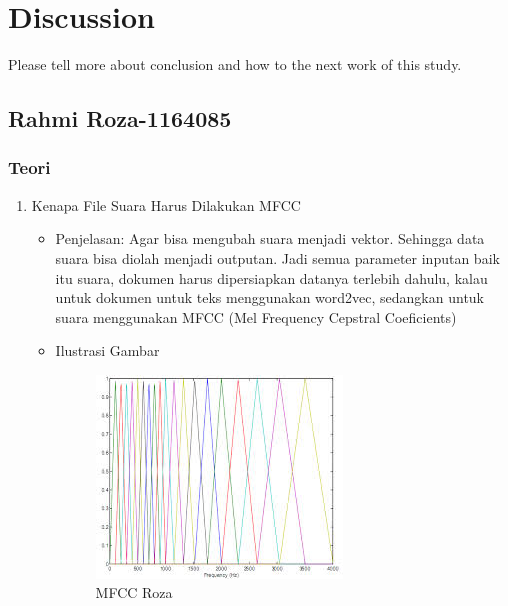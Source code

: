 \chapter{Discussion}
Please tell more about conclusion and how to the next work of this study.

\section{Rahmi Roza-1164085}
\subsection{Teori}
\begin{enumerate}
\item Kenapa File Suara Harus Dilakukan MFCC
\begin{itemize}
\item Penjelasan: Agar bisa mengubah suara menjadi vektor. Sehingga data suara bisa diolah menjadi outputan. Jadi semua parameter inputan baik itu suara, dokumen harus dipersiapkan datanya terlebih dahulu, kalau untuk dokumen untuk teks menggunakan word2vec, sedangkan untuk suara menggunakan MFCC (Mel Frequency Cepstral Coeficients) 
\par 
\par
\item Ilustrasi Gambar
\begin{figure}[!hbtp]
\centering
\includegraphics[scale=0.7]{figures/mfccroza.jpg}
\caption{MFCC Roza}
\label{text-fadila}
\end{figure}
\par
\end{itemize}
\par
\par


\end{enumerate}

